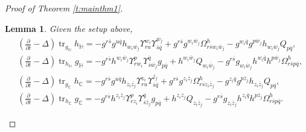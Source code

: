 \documentclass[12pt]{amsart}
\numberwithin{equation}{section}
\newtheorem{lemma}[prop]{Lemma}
\numberwithin{prop}{section}
\theoremstyle{definition}
\renewcommand{\bar}[1]{\overline{#1}}
\begin{document}
\begin{proof}[Proof of Theorem \ref{t:mainthm1}]
\begin{lemma}\label{l:partial trace}
    Given the setup above,
    \begin{align}
        &\left(\frac{\partial}{\partial t} - \Delta \right) \operatorname{tr}_{g_\mathbb{H}}h_{\mathbb{H}} = -g^{r\bar{s}}g^{u\bar{q}}h_{w_i\bar{w_j}}\Upsilon_{ru}^{w_i}\Upsilon_{\bar{s}\bar{q}}^{\bar{w}_j}+g^{r\bar{s}}g^{w_i\bar{w}_j}\Omega^h_{r\bar{s}w_i\bar{w}_j}-g^{w_i\bar{q}}g^{p\bar{w}_j}h_{w_i\bar{w}_j}Q_{p\bar{q}},\label{eq:inverse trace h}\\
        & \left(\frac{\partial}{\partial t} - \Delta \right)  \operatorname{tr}_{h_\mathbb{H}}g_{\mathbb{H}} = -g^{r\bar{s}}h^{w_i\bar{w}_j}\Upsilon^{p}_{rw_i}\Upsilon^{\bar{q}}_{\bar{s}\bar{w}_j}g_{p\bar{q}}+h^{w_i\bar{w}_j}Q_{w_i\bar{w}_j}-g^{r\bar{s}}g_{w_i\bar{w}_j}h^{w_i\bar{q}}h^{p\bar{w}_j}\Omega^h_{r\bar{s}p\bar{q}},\label{eq:trace h}\\
        &\left(\frac{\partial}{\partial t} - \Delta \right)  \operatorname{tr}_{g_\mathbb{C}}h_{\mathbb{C}} = -g^{r\bar{s}}g^{u\bar{q}}h_{z_i\bar{z_j}}\Upsilon_{ru}^{z_i}\Upsilon_{\bar{s}\bar{q}}^{\bar{z}_j}+g^{r\bar{s}}g^{z_i\bar{z}_j}\Omega^h_{r\bar{s}z_i\bar{z}_j}-g^{z_i\bar{q}}g^{p\bar{z}_j}h_{z_i\bar{z}_j}Q_{p\bar{q}},\\
        &\left(\frac{\partial}{\partial t} - \Delta \right)  \operatorname{tr}_{h_\mathbb{C}}g_{\mathbb{C}} = -g^{r\bar{s}}h^{z_i\bar{z}_j}\Upsilon^{p}_{rz_i}\Upsilon^{\bar{q}}_{\bar{s}\bar{z}_j}g_{p\bar{q}}+h^{z_i\bar{z}_j}Q_{z_i\bar{z}_j}-g^{r\bar{s}}g_{z_i\bar{z}_j}h^{z_i\bar{q}}h^{p\bar{z}_j}\Omega^h_{r\bar{s}p\bar{q}}.
    \end{align}
\end{lemma}


\end{proof}
\end{document}
